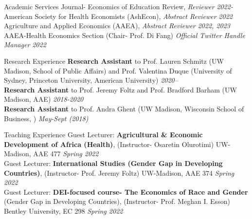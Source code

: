 \documentclass{resume} %
\begin{document}
\begin{rSection}{Academic Services}%
Journal- Economics of Education Review, \textit{Reviewer} {\hfill\textit{2022-}} \\ 
American Society for Health Economists (AshEcon), \textit{Abstract Reviewer} {\hfill\textit{2022}} \\ 
Agriculture and Applied Economics (AAEA), \textit{Abstract Reviewer} {\hfill \textit{2022, 2023}}\\
AAEA-Health Economics Section (Chair- Prof. Di Fang) \textit{Official Twitter Handle Manager} {\hfill \textit{2022}}  
\end{rSection}



\begin{rSection}{Research Experience}
\textbf{Research Assistant} to Prof. Lauren Schmitz (UW Madison, School of Public Affairs) and Prof. Valentina Duque (University of Sydney, Princeton University, American University) \hfill \textit{2020--} \\
\textbf{Research Assistant} to Prof. Jeremy Foltz and Prof. Bradford Barham (UW Madison, AAE) \hfill \textit{2018-2020} \\
\textbf{Research Assistant} to Prof. Andra Ghent (UW Madison, Wisconsin School of Business, ) \hfill \textit{May-Sept (2018)}
\end{rSection}


\begin{rSection}{Teaching Experience}
Guest Lecturer: \textbf{Agricultural \& Economic Development of Africa (Health)}, (Instructor- Osaretin Olurotimi) UW-Madison, AAE 477
 \hfill \textit{Spring 2022} \\
Guest Lecturer: \textbf{International Studies (Gender Gap in Developing Countries)}, (Instructor- Prof. Jeremy Foltz) UW-Madison, AAE 374
 \hfill \textit{Spring 2022} \\
Guest Lecturer: \textbf{DEI-focused course- The Economics of Race and Gender} (Gender Gap in Developing Countries), (Instructor- Prof. Meghan I. Esson) Bentley University, EC 298
 \hfill \textit{Spring 2022}
\end{rSection}
\end{document}
